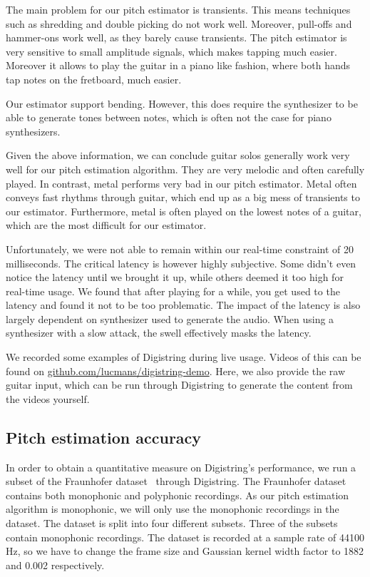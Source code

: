 \documentclass[a4paper,10pt,twocolumn]{article}
\begin{document}
The main problem for our pitch estimator is transients. This means techniques such as shredding and double picking do not work well. Moreover, pull-offs and hammer-ons work well, as they barely cause transients. The pitch estimator is very sensitive to small amplitude signals, which makes tapping much easier. Moreover it allows to play the guitar in a piano like fashion, where both hands tap notes on the fretboard, much easier.

Our estimator support bending. However, this does require the synthesizer to be able to generate tones between notes, which is often not the case for piano synthesizers.

Given the above information, we can conclude guitar solos generally work very well for our pitch estimation algorithm. They are very melodic and often carefully played. In contrast, metal performs very bad in our pitch estimator. Metal often conveys fast rhythms through guitar, which end up as a big mess of transients to our estimator. Furthermore, metal is often played on the lowest notes of a guitar, which are the most difficult for our estimator.

Unfortunately, we were not able to remain within our real-time constraint of 20 milliseconds. The critical latency is however highly subjective. Some didn't even notice the latency until we brought it up, while others deemed it too high for real-time usage. We found that after playing for a while, you get used to the latency and found it not to be too problematic. The impact of the latency is also largely dependent on synthesizer used to generate the audio. When using a synthesizer with a slow attack, the swell effectively masks the latency.

We recorded some examples of Digistring during live usage. Videos of this can be found on \url{github.com/lucmans/digistring-demo}. Here, we also provide the raw guitar input, which can be run through Digistring to generate the content from the videos yourself.


\subsection{Pitch estimation accuracy}
In order to obtain a quantitative measure on Digistring's performance, we run a subset of the Fraunhofer dataset~\cite{dataset} through Digistring. The Fraunhofer dataset contains both monophonic and polyphonic recordings. As our pitch estimation algorithm is monophonic, we will only use the monophonic recordings in the dataset. The dataset is split into four different subsets. Three of the subsets contain monophonic recordings. The dataset is recorded at a sample rate of 44100 Hz, so we have to change the frame size and Gaussian kernel width factor to 1882 and 0.002 respectively.
\end{document}
